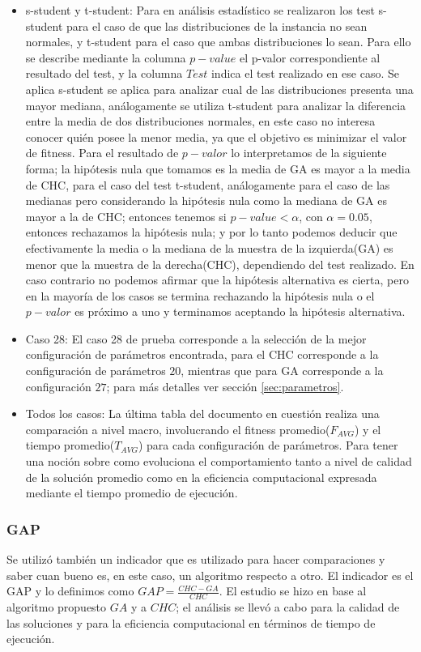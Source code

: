 \documentclass[journal]{IEEEtran}
\begin{document}
\begin{itemize}
  \item s-student y t-student: Para en análisis estadístico se realizaron los test s-student para el caso de que las distribuciones de la instancia no sean normales, y t-student para el caso que ambas distribuciones lo sean. Para ello se describe mediante la columna $p-value$ el p-valor correspondiente al resultado del test, y la columna $Test$ indica el test realizado en ese caso. Se aplica s-student se aplica para analizar cual de las distribuciones presenta una mayor mediana, análogamente se utiliza t-student para analizar la diferencia entre la media de dos distribuciones normales, en este caso no interesa conocer quién posee la menor media, ya que el objetivo es minimizar el valor de fitness. Para el resultado de $p-valor$ lo interpretamos de la siguiente forma; la hipótesis nula que tomamos es la media de GA es mayor a la media de CHC, para el caso del test t-student, análogamente para el caso de las medianas pero considerando la hipótesis nula como la mediana de GA es mayor a la de CHC; entonces tenemos si $p-value < \alpha$, con $\alpha=0.05$, entonces rechazamos la hipótesis nula; y por lo tanto podemos deducir que efectivamente la media o la mediana de la muestra de la izquierda(GA) es menor que la muestra de la derecha(CHC), dependiendo del test realizado. En caso contrario no podemos afirmar que la hipótesis alternativa es cierta, pero en la mayoría de los casos se termina rechazando la hipótesis nula o el $p-valor$ es próximo a uno y terminamos aceptando la hipótesis alternativa.
  \item Caso 28: El caso 28 de prueba corresponde a la selección de la mejor configuración de parámetros encontrada, para el CHC corresponde a la configuración de parámetros $20$, mientras que para GA corresponde a la configuración $27$; para más detalles ver sección \ref{sec:parametros}.
  \item Todos los casos: La última tabla del documento en cuestión realiza una comparación a nivel macro, involucrando el fitness promedio($F_{AVG}$) y el tiempo promedio($T_{AVG}$) para cada configuración de parámetros. Para tener una noción sobre como evoluciona el comportamiento tanto a nivel de calidad de la solución promedio como en la eficiencia computacional expresada mediante el tiempo promedio de ejecución.
\end{itemize}

\subsubsection{GAP}
Se utilizó también un indicador que es utilizado para hacer comparaciones y saber cuan bueno es, en este caso, un algoritmo respecto a otro. El indicador es el GAP y lo definimos como $GAP=\frac{CHC-GA}{CHC}$. El estudio se hizo en base al algoritmo propuesto $GA$ y a $CHC$; el análisis se llevó a cabo para la calidad de las soluciones y para la eficiencia computacional en términos de tiempo de ejecución.
\end{document}
